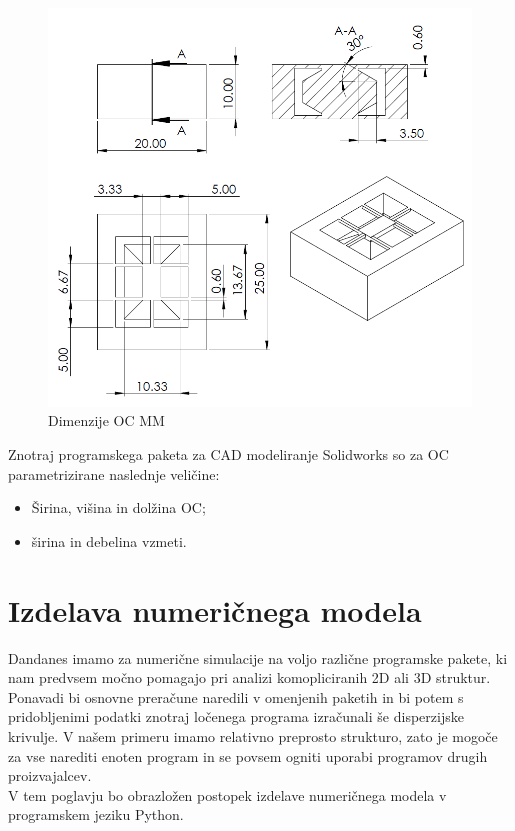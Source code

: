 \documentclass[12pt]{report}
\begin{document}
\begin{figure}[H]
  \centering
  \includegraphics[scale=0.8]{Images/drawing.png}
  \caption{Dimenzije \ac{OC} \ac{MM}}
\end{figure}
Znotraj programskega paketa za CAD modeliranje Solidworks so za \ac{OC} parametrizirane naslednje veličine:
\begin{itemize}
  \item Širina, višina in dolžina \ac{OC};
  \item širina in debelina vzmeti.
\end{itemize}

\section{Izdelava numeričnega modela}
Dandanes imamo za numerične simulacije na voljo različne programske pakete, ki nam predvsem močno pomagajo pri analizi komopliciranih 2D ali 3D struktur. Ponavadi bi osnovne preračune naredili
v omenjenih paketih in bi potem s pridobljenimi podatki znotraj ločenega programa izračunali še disperzijske krivulje.
V našem primeru imamo relativno preprosto strukturo, zato je mogoče za vse narediti enoten program in se povsem ogniti uporabi programov drugih proizvajalcev.
\\
V tem poglavju bo obrazložen postopek izdelave numeričnega modela v programskem jeziku Python.
\end{document}
